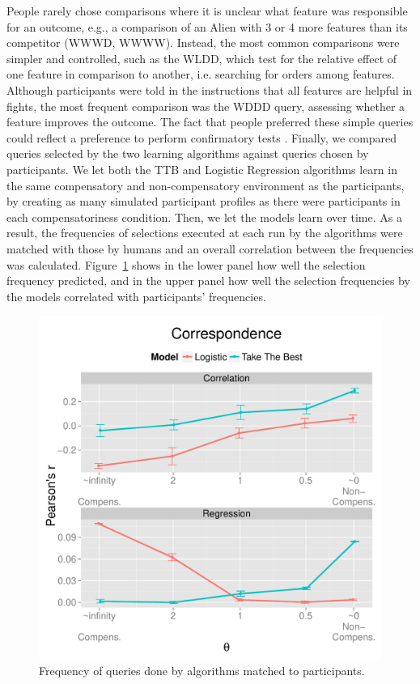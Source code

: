 \documentclass[10pt,letterpaper]{article}
\begin{document}
People rarely chose comparisons where it is unclear what feature was responsible for an outcome, e.g., a  comparison of an Alien with 3 or 4 more features than its competitor (WWWD, WWWW). Instead, the most common comparisons were simpler and controlled, such as the WLDD, which test for the relative effect of one feature in comparison to another, i.e. searching for orders among features. Although participants were told in the instructions that all features are helpful in fights, the most frequent comparison was the WDDD query, assessing whether a feature improves the outcome. The fact that people preferred these simple queries could reflect a preference to perform confirmatory tests \citep{markant2012one}. Finally, we compared queries selected by the two learning algorithms against queries chosen by participants. We let both the TTB and Logistic Regression algorithms learn in the same compensatory and non-compensatory environment as the participants, by creating as many simulated participant profiles as there were participants in each compensatoriness condition. Then, we let the models learn over time. As a result, the frequencies of selections executed at each run by the algorithms were matched with those by humans and an overall correlation between the frequencies was calculated. Figure~\ref{result} shows in the lower panel how well the selection frequency predicted, and in the upper panel how well the selection frequencies by the models correlated with participants' frequencies.
\begin{figure}[htb!]
	\centering
\caption{Frequency of queries done by algorithms matched to participants.}
	\label{result}
	\includegraphics[scale=0.5]{results.pdf}
	
\end{figure}
\end{document}
